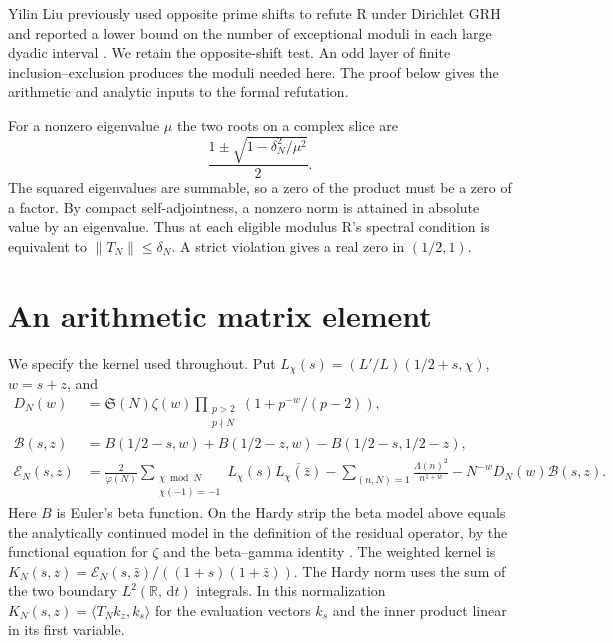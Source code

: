 \documentclass[11pt,a4paper]{article}
\newcommand{\SSg}{\mathfrak S}
\newcommand{\dd}{\,\mathrm d}
\begin{document}
Yilin Liu previously used opposite prime shifts to refute R under Dirichlet GRH and reported a lower bound on the number of exceptional moduli in each large dyadic interval \cite{YL}. We retain the opposite-shift test. An odd layer of finite inclusion--exclusion produces the moduli needed here. The proof below gives the arithmetic and analytic inputs to the formal refutation.

For a nonzero eigenvalue $\mu$ the two roots on a complex slice are
\[
              \frac{1\pm\sqrt{1-\delta_N^2/\mu^2}}2 .
\]
The squared eigenvalues are summable, so a zero of the product must be a zero of a factor. By compact self-adjointness, a nonzero norm is attained in absolute value by an eigenvalue. Thus at each eligible modulus R's spectral condition is equivalent to $\|T_N\|\le\delta_N$. A strict violation gives a real zero in $(1/2,1)$.

\section{An arithmetic matrix element}\label{sec:entry}
We specify the kernel used throughout. Put $L_\chi(s)=(L'/L)(1/2+s,\chi)$, $w=s+z$, and
\begin{align*}
 D_N(w)&=\SSg(N)\zeta(w)\prod_{\substack{p>2\\p\nmid N}}
                    (1+p^{-w}/(p-2)),\\
 \mathcal B(s,z)&=B(1/2-s,w)+B(1/2-z,w)-B(1/2-s,1/2-z),\\
 \mathcal E_N(s,z)&=\frac{2}{\varphi(N)}
       \sum_{\substack{\chi\bmod N\\\chi(-1)=-1}} L_\chi(s)\overline{L_\chi(\bar z)}
       -\sum_{(n,N)=1}\frac{\Lambda(n)^2}{n^{1+w}}-N^{-w}D_N(w)\mathcal B(s,z).
\end{align*}
Here $B$ is Euler's beta function. On the Hardy strip the beta model above equals the analytically continued model in the definition of the residual operator, by the functional equation for $\zeta$ and the beta--gamma identity \cite{LL,LLLean}. The weighted kernel is
$K_N(s,z)=\mathcal E_N(s,\bar z)/((1+s)(1+\bar z))$. The Hardy norm uses the sum of the two boundary $L^2(\mathbb R,\dd t)$ integrals. In this normalization $K_N(s,z)=\langle T_Nk_z,k_s\rangle$ for the evaluation vectors $k_s$ and the inner product linear in its first variable.
\end{document}
